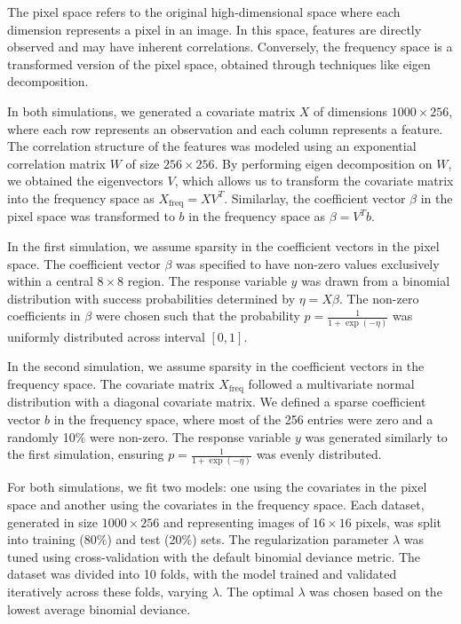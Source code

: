 \documentclass[12pt]{article}
\begin{document}
The pixel space refers to the original high-dimensional space where each dimension represents a pixel in an image. In this space, features are directly observed and may have inherent correlations. Conversely, the frequency space is a transformed version of the pixel space, obtained through techniques like eigen decomposition.

In both simulations, we generated a covariate matrix \( X \) of dimensions \( 1000 \times 256 \), where each row represents an observation and each column represents a feature. The correlation structure of the features was modeled using an exponential correlation matrix \( W \) of size \( 256 \times 256 \). By performing eigen decomposition on \( W \), we obtained the eigenvectors \( V \), which allows us to transform the covariate matrix into the frequency space as \( X_{\text{freq}} = X V^T \). Similarlay, the coefficient vector \( \beta \) in the pixel space was transformed to \( b \) in the frequency space as \( \beta = V^T b \).


In the first simulation, we assume sparsity in the coefficient vectors in the pixel space. The coefficient vector \( \beta \) was specified to have non-zero values exclusively within a central \( 8 \times 8 \) region. The response variable \( y \) was drawn from a binomial distribution with success probabilities determined by \( \eta = X \beta \). The non-zero coefficients in \( \beta \) were chosen such that the probability \( p = \frac{1}{1 + \exp(-\eta)} \) was uniformly distributed across interval \( [0, 1] \).

In the second simulation, we assume sparsity in the coefficient vectors in the frequency space. The covariate matrix \( X_{\text{freq}} \) followed a multivariate normal distribution with a diagonal covariate matrix. We defined a sparse coefficient vector \( b \) in the frequency space, where most of the 256 entries were zero and a randomly 10\% were non-zero. The response variable \( y \) was generated similarly to the first simulation, ensuring \( p = \frac{1}{1 + \exp(-\eta)} \) was evenly distributed.

For both simulations, we fit two models: one using the covariates in the pixel space and another using the covariates in the frequency space. Each dataset, generated in size \( 1000 \times 256 \) and representing images of \( 16 \times 16 \) pixels, was split into training (80\%) and test (20\%) sets. The regularization parameter \( \lambda \) was tuned using cross-validation with the default binomial deviance metric. The dataset was divided into 10 folds, with the model trained and validated iteratively across these folds, varying \( \lambda \). The optimal \( \lambda \) was chosen based on the lowest average binomial deviance.
\end{document}
